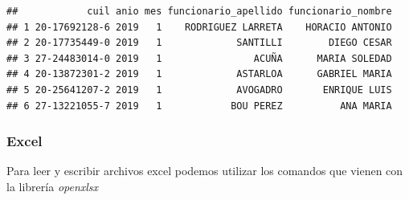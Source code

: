 \documentclass[]{book}
\begin{document}
\begin{verbatim}
##            cuil anio mes funcionario_apellido funcionario_nombre
## 1 20-17692128-6 2019   1    RODRIGUEZ LARRETA    HORACIO ANTONIO
## 2 20-17735449-0 2019   1             SANTILLI        DIEGO CESAR
## 3 27-24483014-0 2019   1                ACUÑA      MARIA SOLEDAD
## 4 20-13872301-2 2019   1             ASTARLOA      GABRIEL MARIA
## 5 20-25641207-2 2019   1             AVOGADRO       ENRIQUE LUIS
## 6 27-13221055-7 2019   1            BOU PEREZ          ANA MARIA
\end{verbatim}

\hypertarget{excel}{%
\subsubsection{Excel}\label{excel}}

Para leer y escribir archivos excel podemos utilizar los comandos que vienen con la librería \emph{openxlsx}
\end{document}
